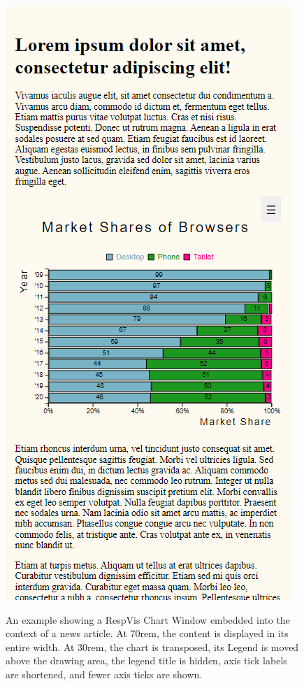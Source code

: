 \begin{figure}[tp]
{  \includegraphics[valign=b,scale=\respscale]{images/respvis-article-30rem.png}%
  \label{fig:Article30rem}%
}
\caption[News Article with Embedded RespVis Chart]{%
An example showing a RespVis Chart Window embedded into the context of
a news article.  At 70rem, the content is
displayed in its entire width.  At 30rem, the
chart is transposed, its Legend is moved above the drawing area, the
legend title is hidden, axis tick labels are shortened, and fewer axis
ticks are shown.
}
\label{fig:Article}
\end{figure}



